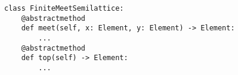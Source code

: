 \begin{verbatim}
class FiniteMeetSemilattice:
    @abstractmethod
    def meet(self, x: Element, y: Element) -> Element:
        ...
    @abstractmethod
    def top(self) -> Element:
        ...
\end{verbatim}